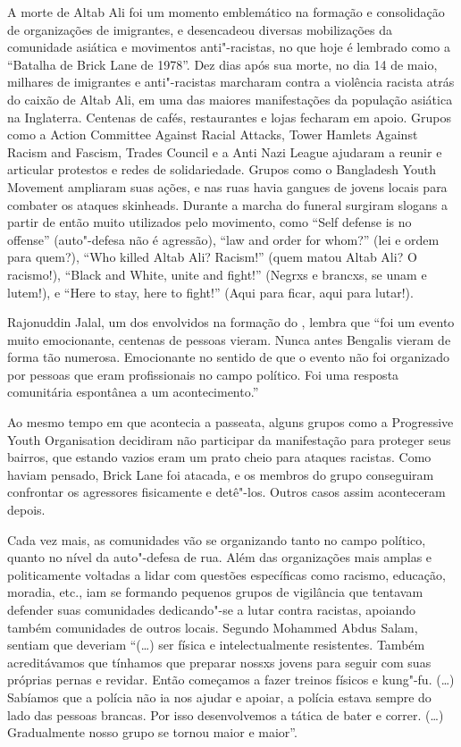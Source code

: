 A morte de Altab Ali foi um momento emblemático na formação e consolidação de organizações de imigrantes, e desencadeou diversas mobilizações da comunidade asiática e movimentos anti"-racistas, no que hoje é lembrado como a ``Batalha de Brick Lane de 1978''. Dez dias após sua morte, no dia 14 de maio, milhares de imigrantes e anti"-racistas marcharam contra a violência racista atrás do caixão de Altab Ali, em uma das maiores manifestações da população asiática na Inglaterra. Centenas de cafés, restaurantes e lojas fecharam em apoio. Grupos como a Action Committee Against Racial Attacks, Tower Hamlets Against Racism and Fascism, Trades Council e a Anti Nazi League ajudaram a reunir e articular protestos e redes de solidariedade. Grupos como o Bangladesh Youth Movement ampliaram suas ações, e nas ruas havia gangues de jovens locais para combater os ataques skinheads. Durante a marcha do funeral surgiram slogans a partir de então muito utilizados pelo movimento, como ``Self defense is no offense'' (auto"-defesa não é agressão), ``law and order for whom?'' (lei e ordem para quem?), ``Who killed Altab Ali? Racism!'' (quem matou Altab Ali? O racismo!), ``Black and White, unite and fight!'' (Negrxs e brancxs, se unam e lutem!), e ``Here to stay, here to fight!'' (Aqui para ficar, aqui para lutar!).

Rajonuddin Jalal, um dos envolvidos na formação do , lembra que ``foi um evento muito emocionante, centenas de pessoas vieram. Nunca antes Bengalis vieram de forma tão numerosa. Emocionante no sentido de que o evento não foi organizado por pessoas que eram profissionais no campo político. Foi uma resposta comunitária espontânea a um acontecimento.''

Ao mesmo tempo em que acontecia a passeata, alguns grupos como a Progressive Youth Organisation decidiram não participar da manifestação para proteger seus bairros, que estando vazios eram um prato cheio para ataques racistas. Como haviam pensado, Brick Lane foi atacada, e os membros do grupo conseguiram confrontar os agressores fisicamente e detê"-los. Outros casos assim aconteceram depois.

Cada vez mais, as comunidades vão se organizando tanto no campo político, quanto no nível da auto"-defesa de rua. Além das organizações mais amplas e politicamente voltadas a lidar com questões específicas como racismo, educação, moradia, etc., iam se formando pequenos grupos de vigilância que tentavam defender suas comunidades dedicando"-se a lutar contra racistas, apoiando também comunidades de outros locais. Segundo Mohammed Abdus Salam, sentiam que deveriam ``(\ldots{}) ser física e intelectualmente resistentes. Também acreditávamos que tínhamos que preparar nossxs jovens para seguir com suas próprias pernas e revidar. Então começamos a fazer treinos físicos e kung"-fu. (\ldots{}) Sabíamos que a polícia não ia nos ajudar e apoiar, a polícia estava sempre do lado das pessoas brancas. Por isso desenvolvemos a tática de bater e correr. (\ldots{}) Gradualmente nosso grupo se tornou maior e maior''.


